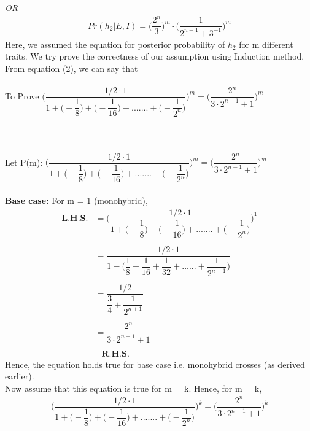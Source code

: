 \documentclass{article}
\begin{document}
\begin{itemize}
\hspace{7cm} \textit{OR}\\
\begin{align*}
Pr(h_2|E,I) =\Big(\dfrac{2^n}{3}\Big)^m \cdot \Big(\dfrac{1}{2^{n-1} + 3^{-1}}\Big)^{m}
\end{align*}
Here, we assumed the equation for posterior probability of $ h_2 $ for m different traits. We try prove the correctness of our assumption using Induction method. From equation (2), we can say that \\\\
To Prove $\Bigg(\dfrac{1/2 \cdot 1}{1 + \Big(-\dfrac{1}{8}\Big) + \Big(-\dfrac{1}{16}\Big) +.......+ \Big(-\dfrac{1}{2^{n}}\Big)}\Bigg)^{m} = \Big(\dfrac{2^n}{3\cdot 2^{n-1} + 1}\Big)^{m}$\\\\\\\\
Let P(m): $\Bigg(\dfrac{1/2 \cdot 1}{1 + \Big(-\dfrac{1}{8}\Big) + \Big(-\dfrac{1}{16}\Big) +.......+ \Big(-\dfrac{1}{2^{n}}\Big)}\Bigg)^{m} = \Big(\dfrac{2^n}{3\cdot 2^{n-1} + 1}\Big)^{m} $ \\\\
\textbf{Base case:} For m = 1 (monohybrid),
\begin{align*}
\textbf{L.H.S.} &= \Bigg(\dfrac{1/2 \cdot 1}{1 + \Big(-\dfrac{1}{8}\Big) + \Big(-\dfrac{1}{16}\Big) +.......+ \Big(-\dfrac{1}{2^{n}}\Big)}\Bigg)^{1}\\\\
&= \dfrac{1/2 \cdot 1}{1 - \Big(\dfrac{1}{8} + \dfrac{1}{16} + \dfrac{1}{32} +......+ \dfrac{1}{2^{n+1}}\Big)}\\\\  
&= \dfrac{1/2}{\dfrac{3}{4} + \dfrac{1}{2^{n+1}}} \\\\
&= \dfrac{2^n}{3\cdot 2^{n-1} + 1}\\\\
&= \textbf{R.H.S.}
\end{align*}
Hence, the equation holds true for base case i.e. monohybrid crosses (as derived earlier).\\
Now assume that this equation is true for m = k. Hence, for m = k,\\
\begin{align*}
\Bigg(\dfrac{1/2 \cdot 1}{1 + \Big(-\dfrac{1}{8}\Big) + \Big(-\dfrac{1}{16}\Big) +.......+ \Big(-\dfrac{1}{2^{n}}\Big)}\Bigg)^{k} = \Big(\dfrac{2^n}{3\cdot 2^{n-1} + 1}\Big)^{k}
\end{align*}\\

\end{itemize}
\end{document}
